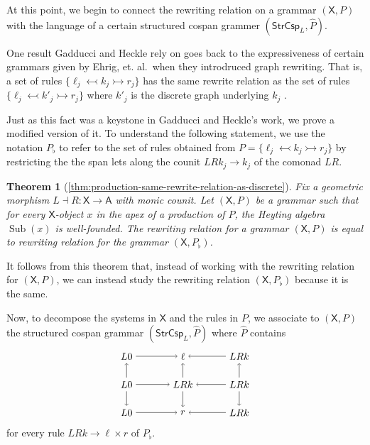 \documentclass{amsart}
\renewcommand{\hat}[1]{\widehat{#1}}
\newcommand{\A}{\cat{A}}
\newcommand{\X}{\cat{X}}
\newcommand{\StrCsp}{\cat{StrCsp}}
\newcommand{\cat}[1]{\mathsf{#1}}
\newcommand{\from}{\colon}
\newcommand{\monicto}{\rightarrowtail}
\newcommand{\monicgets}{\leftarrowtail}
\DeclareMathOperator{\Sub}{Sub}
\newtheorem*{theorem*}{Theorem}
\theoremstyle{remark}
\theoremstyle{definition}
\begin{document}
At this point, we begin to connect the rewriting relation on a grammar
$ ( \X , P ) $ with the language of a certain structured cospan
grammer $ ( \StrCsp_L , \hat{P} ) $.

One result Gadducci and Heckle rely on goes back to the expressiveness
of certain grammars given by Ehrig, et. al.~when they introdruced graph
rewriting.  That is, a set of rules
$ \{ \ell_j \monicgets k_j \monicto r_j \} $ has the same rewrite
relation as the set of rules
$ \{ \ell_j \monicgets k'_j \monicto r_j \} $ where $ k'_j $ is the
discrete graph underlying $ k_j $ \cite[Prop.~3.3]{Ehrig_GraphGram}.

Just as this fact was a keystone in Gadducci and Heckle's work, we
prove a modified version of it. To understand the following statement,
we use the notation $ P_\flat $ to refer to the set of rules obtained
from $ P = \{ \ell_j \monicgets k_j \monicto r_j \} $ by restricting
the the span lets along the counit $ LRk_j \to k_j $ of the comonad
$ LR $.

\begin{theorem*}[\ref{thm:production-same-rewrite-relation-as-discrete}]
Fix a geometric morphism $ L \dashv R \from \X \to \A $ with monic
counit. Let $ ( \X , P ) $ be a grammar such that for every
$ \X $-object $ x $ in the apex of a production of $ P $, the Heyting
algebra $ \Sub (x) $ is well-founded.  The rewriting relation for a
grammar $ ( \X , P ) $ is equal to rewriting relation for the grammar
$ ( \X , P_{\flat} ) $.
\end{theorem*}

It follows from this theorem that, instead of working with the
rewriting relation for $ ( \X , P ) $, we can instead study the
rewriting relation $ ( \X , P_\flat ) $ because it is the same.

Now, to decompose the systems in $ \X $ and the rules in $ P $, we
associate to $ ( \X , P ) $ the structured cospan grammar
$ ( \StrCsp_L , \hat{P} ) $ where $ \hat{P} $ contains
%
\[
  \begin{tikzpicture}
    \node (1) at (0,2) {$ L 0 $};
    \node (2) at (2,2) {$ \ell $};
    \node (3) at (4,2) {$ LRk $};
    \node (4) at (0,1) {$ L 0 $};
    \node (5) at (2,1) {$ LRk $};
    \node (6) at (4,1) {$ LRk $};
    \node (7) at (0,0) {$ L 0 $};
    \node (8) at (2,0) {$ r $};
    \node (9) at (4,0) {$ LRk $};
    \draw [->] (1) to node [] {\scriptsize{$  $}} (2);
    \draw [->] (3) to node [] {\scriptsize{$  $}} (2);
    \draw [->] (4) to node [] {\scriptsize{$  $}} (5);
    \draw [->] (6) to node [] {\scriptsize{$  $}} (5);
    \draw [->] (7) to node [] {\scriptsize{$  $}} (8);
    \draw [->] (9) to node [] {\scriptsize{$  $}} (8);
    \draw [->] (4) to node [] {\scriptsize{$  $}} (1);
    \draw [->] (4) to node [] {\scriptsize{$  $}} (7);
    \draw [->] (5) to node [] {\scriptsize{$  $}} (2);
    \draw [->] (5) to node [] {\scriptsize{$  $}} (8);
    \draw [->] (6) to node [] {\scriptsize{$  $}} (3);
    \draw [->] (6) to node [] {\scriptsize{$  $}} (9);
  \end{tikzpicture}
\]
% 
for every rule $ LRk \to \ell \times r $ of $ P_{\flat} $.
\end{document}
